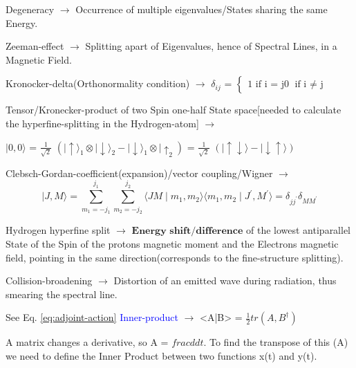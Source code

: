 \documentclass[a4paper, 10pt, onepage]{elegantbook}
\begin{document}
{Degeneracy $\longrightarrow$ Occurrence of multiple eigenvalues/States sharing the same Energy. 

Zeeman-effect $\longrightarrow$ Splitting apart of Eigenvalues, hence of Spectral Lines, in a 
Magnetic Field. 

Kronocker-delta(Orthonormality condition) $\longrightarrow$
$\delta_{ij}$ = $\left\{
\begin{array}{ll}
1 \text{ if i = j}  
0 \text{ if i $\neq$ j} 
\end{array} 
\right.$ 
 
Tensor/Kronecker-product of two Spin one-half State space[needed to 
calculate the hyperfine-splitting in the Hydrogen-atom] 
$\longrightarrow$  

$ \mid 0, 0 \rangle$ =  
$\frac{1}{\sqrt 2}$ $\left( \mid \uparrow \rangle_1 \otimes \mid \downarrow \rangle_2 - \mid \downarrow \rangle_1 
\otimes \mid \uparrow_2 \right)$ = $\frac{1}{\sqrt 2}$ $\left( \mid \uparrow \downarrow \rangle - \mid \downarrow 
\uparrow \rangle \right)$  
  
Clebsch-Gordan-coefficient(expansion)/vector coupling/Wigner $\longrightarrow$ 
\begin{equation}
\mid J,M \rangle = \sum_{m_1 = {-j_1}}^{j_1} \sum_{m_2 = {-j_2}}^{j_2} \langle{JM} \mid {m_1,m_2} \rangle 
\langle{m_1,m_2} \mid J^{'},M^{'} \rangle = \delta_{jj^{'}} \delta_{MM^{'}}
\end{equation}
    
Hydrogen hyperfine split $\longrightarrow$ $\mathbf{\text{Energy shift/difference}}$ of the lowest 
antiparallel State of the Spin of the protons magnetic moment and the Electrons magnetic field, pointing in the same 
direction(corresponds to the fine-structure splitting).  
    
Collision-broadening $\longrightarrow$ Distortion of an emitted wave during radiation, thus 
smearing the spectral line. 
 
See Eq. \eqref{eq:adjoint-action} \quad \textcolor{blue}{Inner-product} $\longrightarrow$ <A|B> = 
$\frac{1}{2}tr(A,B^\dagger)$ 

A matrix changes  a derivative, so A = $frac{d}{dt}$. To find the transpose of this (A) we need to define
the Inner Product between two functions x(t) and y(t). 

}
\end{document}

